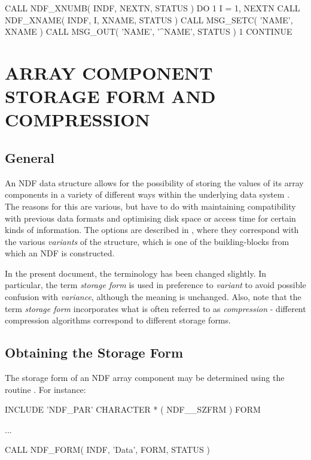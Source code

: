 \documentclass[twoside,11pt,nolof]{starlink}
\providecommand{\st}[1]{{\emph{#1}}}
\begin{document}
\small
\begin{terminalv}
      CALL NDF_XNUMB( INDF, NEXTN, STATUS )
      DO 1 I = 1, NEXTN
         CALL NDF_XNAME( INDF, I, XNAME, STATUS )
         CALL MSG_SETC( 'NAME', XNAME )
         CALL MSG_OUT( 'NAME', '^NAME', STATUS )
 1    CONTINUE
\end{terminalv}
\normalsize


\section{\label{ss:storageform}ARRAY
COMPONENT STORAGE FORM AND COMPRESSION}

\subsection{General}

An NDF data structure allows for the possibility of storing the values of
its array components in a variety of different ways within the underlying
data system .
The reasons for this are various, but have to do with maintaining
compatibility with previous data formats and optimising disk space or access
time for certain kinds of information.
The options are described in , where they
correspond with the various
\st{variants\/} of the  structure, which is one
of the building-blocks from which an NDF is constructed.

In the present document, the terminology has been changed slightly.
In particular, the term \st{storage form\/} is used in preference to
\st{variant\/} to avoid possible confusion with \st{variance},
although the meaning is unchanged. Also, note that the term \st{storage
form\/} incorporates what is often referred to as \st{compression\/} -
different compression algorithms correspond to different storage forms.

\subsection{Obtaining the Storage Form}

The storage form of an NDF array component may be determined using the
routine .
For instance:

\small
\begin{terminalv}
      INCLUDE 'NDF_PAR'
      CHARACTER * ( NDF__SZFRM ) FORM

      ...

      CALL NDF_FORM( INDF, 'Data', FORM, STATUS )
\end{terminalv}
\normalsize
\end{document}
